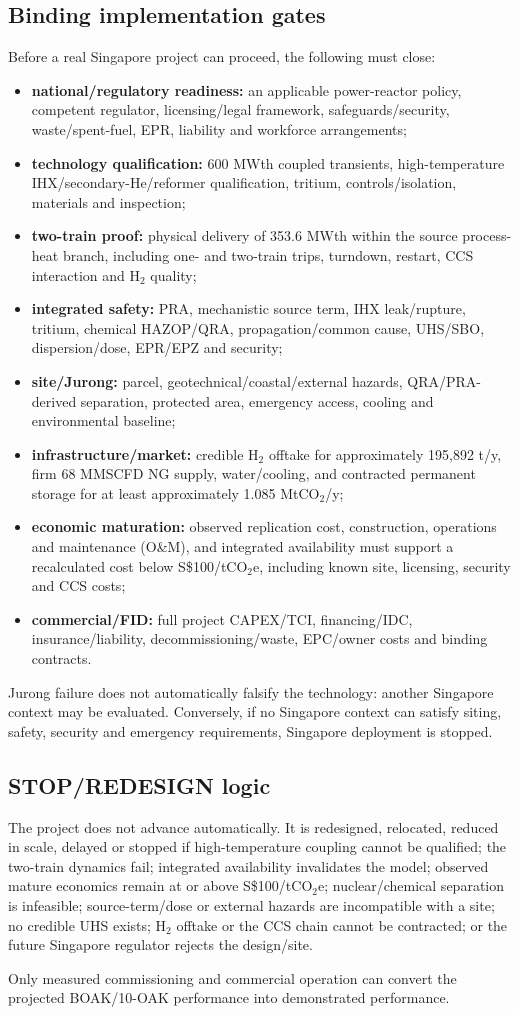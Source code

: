 \subsection{Binding implementation gates}
Before a real Singapore project can proceed, the following must close:
\begin{itemize}
\item \textbf{national/regulatory readiness:} an applicable power-reactor policy, competent regulator, licensing/legal framework, safeguards/security, waste/spent-fuel, EPR, liability and workforce arrangements;
\item \textbf{technology qualification:} 600 MWth coupled transients, high-temperature IHX/secondary-He/reformer qualification, tritium, controls/isolation, materials and inspection;
\item \textbf{two-train proof:} physical delivery of 353.6 MWth within the source process-heat branch, including one- and two-train trips, turndown, restart, CCS interaction and H$_2$ quality;
\item \textbf{integrated safety:} PRA, mechanistic source term, IHX leak/rupture, tritium, chemical HAZOP/QRA, propagation/common cause, UHS/SBO, dispersion/dose, EPR/EPZ and security;
\item \textbf{site/Jurong:} parcel, geotechnical/coastal/external hazards, QRA/PRA-derived separation, protected area, emergency access, cooling and environmental baseline;
\item \textbf{infrastructure/market:} credible H$_2$ offtake for approximately 195,892 t/y, firm 68 MMSCFD NG supply, water/cooling, and contracted permanent storage for at least approximately 1.085 MtCO$_2$/y;
\item \textbf{economic maturation:} observed replication cost, construction, operations and maintenance (O\&M), and integrated availability must support a recalculated cost below S\$100/tCO$_2$e, including known site, licensing, security and CCS costs;
\item \textbf{commercial/FID:} full project CAPEX/TCI, financing/IDC, insurance/liability, decommissioning/waste, EPC/owner costs and binding contracts.
\end{itemize}

Jurong failure does not automatically falsify the technology: another Singapore context may be evaluated. Conversely, if no Singapore context can satisfy siting, safety, security and emergency requirements, Singapore deployment is stopped.

\subsection{STOP/REDESIGN logic}
The project does not advance automatically. It is redesigned, relocated, reduced in scale, delayed or stopped if high-temperature coupling cannot be qualified; the two-train dynamics fail; integrated availability invalidates the model; observed mature economics remain at or above S\$100/tCO$_2$e; nuclear/chemical separation is infeasible; source-term/dose or external hazards are incompatible with a site; no credible UHS exists; H$_2$ offtake or the CCS chain cannot be contracted; or the future Singapore regulator rejects the design/site.

Only measured commissioning and commercial operation can convert the projected BOAK/10-OAK performance into demonstrated performance.




